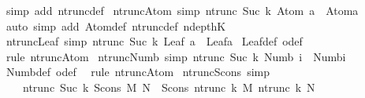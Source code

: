 \begin{isabellebody}
%
\endisadelimproof
%
\isatagproof
{}\isamarkupfalse%
\ {\isacharparenleft}simp\ add{\isacharcolon}\ ntrunc{\isacharunderscore}def{\isacharparenright}%
\endisatagproof
{\isafoldproof}%
%
\isadelimproof
\isanewline
%
\endisadelimproof
\isanewline
{}\isamarkupfalse%
\ ntrunc{\isacharunderscore}Atom\ {\isacharbrackleft}simp{\isacharbrackright}{\isacharcolon}\ {\isachardoublequoteopen}ntrunc\ {\isacharparenleft}Suc\ k{\isacharparenright}\ {\isacharparenleft}Atom\ a{\isacharparenright}\ {\isacharequal}\ Atom{\isacharparenleft}a{\isacharparenright}{\isachardoublequoteclose}\isanewline
%
\isadelimproof
%
\endisadelimproof
%
\isatagproof
{}\isamarkupfalse%
\ {\isacharparenleft}auto\ simp\ add{\isacharcolon}\ Atom{\isacharunderscore}def\ ntrunc{\isacharunderscore}def\ ndepth{\isacharunderscore}K{}{\isacharparenright}%
\endisatagproof
{\isafoldproof}%
%
\isadelimproof
\isanewline
%
\endisadelimproof
\isanewline
{}\isamarkupfalse%
\ ntrunc{\isacharunderscore}Leaf\ {\isacharbrackleft}simp{\isacharbrackright}{\isacharcolon}\ {\isachardoublequoteopen}ntrunc\ {\isacharparenleft}Suc\ k{\isacharparenright}\ {\isacharparenleft}Leaf\ a{\isacharparenright}\ {\isacharequal}\ Leaf{\isacharparenleft}a{\isacharparenright}{\isachardoublequoteclose}\isanewline
%
\isadelimproof
%
\endisadelimproof
%
\isatagproof
{}\isamarkupfalse%
\ Leaf{\isacharunderscore}def\ o{\isacharunderscore}def\ \isamarkupfalse%
\ {\isacharparenleft}rule\ ntrunc{\isacharunderscore}Atom{\isacharparenright}%
\endisatagproof
{\isafoldproof}%
%
\isadelimproof
\isanewline
%
\endisadelimproof
\isanewline
{}\isamarkupfalse%
\ ntrunc{\isacharunderscore}Numb\ {\isacharbrackleft}simp{\isacharbrackright}{\isacharcolon}\ {\isachardoublequoteopen}ntrunc\ {\isacharparenleft}Suc\ k{\isacharparenright}\ {\isacharparenleft}Numb\ i{\isacharparenright}\ {\isacharequal}\ Numb{\isacharparenleft}i{\isacharparenright}{\isachardoublequoteclose}\isanewline
%
\isadelimproof
%
\endisadelimproof
%
\isatagproof
{}\isamarkupfalse%
\ Numb{\isacharunderscore}def\ o{\isacharunderscore}def\ \isamarkupfalse%
\ {\isacharparenleft}rule\ ntrunc{\isacharunderscore}Atom{\isacharparenright}%
\endisatagproof
{\isafoldproof}%
%
\isadelimproof
\isanewline
%
\endisadelimproof
\isanewline
{}\isamarkupfalse%
\ ntrunc{\isacharunderscore}Scons\ {\isacharbrackleft}simp{\isacharbrackright}{\isacharcolon}\ \isanewline
\ \ \ \ {\isachardoublequoteopen}ntrunc\ {\isacharparenleft}Suc\ k{\isacharparenright}\ {\isacharparenleft}Scons\ M\ N{\isacharparenright}\ {\isacharequal}\ Scons\ {\isacharparenleft}ntrunc\ k\ M{\isacharparenright}\ {\isacharparenleft}ntrunc\ k\ N{\isacharparenright}{\isachardoublequoteclose}\isanewline

\end{isabellebody}
